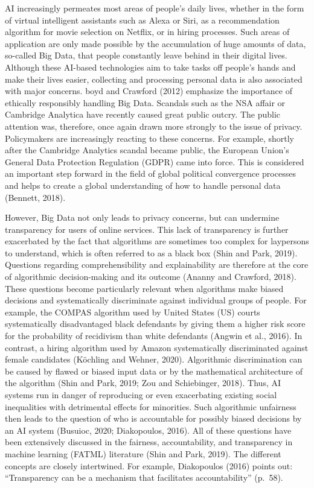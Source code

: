 \documentclass{article}
\begin{document}
AI increasingly permeates most areas of people's daily lives, whether in
the form of virtual intelligent assistants such as Alexa or Siri, as a
recommendation algorithm for movie selection on Netflix, or in hiring
processes. Such areas of application are only made possible by the
accumulation of huge amounts of data, so-called Big Data, that people
constantly leave behind in their digital lives. Although these AI-based
technologies aim to take tasks off people's hands and make their lives
easier, collecting and processing personal data is also associated with
major concerns. boyd and Crawford (2012) emphasize the importance of
ethically responsibly handling Big Data. Scandals such as the NSA affair
or Cambridge Analytica have recently caused great public outcry. The
public attention was, therefore, once again drawn more strongly to the
issue of privacy. Policymakers are increasingly reacting to these
concerns. For example, shortly after the Cambridge Analytics scandal
became public, the European Union's General Data Protection Regulation
(GDPR) came into force. This is considered an important step forward in
the field of global political convergence processes and helps to create
a global understanding of how to handle personal data (Bennett, 2018).

However, Big Data not only leads to privacy concerns, but can undermine
transparency for users of online services. This lack of transparency is
further exacerbated by the fact that algorithms are sometimes too
complex for laypersons to understand, which is often referred to as a
black box (Shin and Park, 2019). Questions regarding comprehensibility
and explainability are therefore at the core of algorithmic
decision-making and its outcome (Ananny and Crawford, 2018). These
questions become particularly relevant when algorithms make biased
decisions and systematically discriminate against individual groups of
people. For example, the COMPAS algorithm used by United States (US)
courts systematically disadvantaged black defendants by giving them a
higher risk score for the probability of recidivism than white
defendants (Angwin et al., 2016). In contrast, a hiring algorithm used
by Amazon systematically discriminated against female candidates
(Köchling and Wehner, 2020). Algorithmic discrimination can be caused by
flawed or biased input data or by the mathematical architecture of the
algorithm (Shin and Park, 2019; Zou and Schiebinger, 2018). Thus, AI
systems run in danger of reproducing or even exacerbating existing
social inequalities with detrimental effects for minorities. Such
algorithmic unfairness then leads to the question of who is accountable
for possibly biased decisions by an AI system (Busuioc, 2020;
Diakopoulos, 2016). All of these questions have been extensively
discussed in the fairness, accountability, and transparency in machine
learning (FATML) literature (Shin and Park, 2019). The different
concepts are closely intertwined. For example, Diakopoulos (2016) points
out: ``Transparency can be a mechanism that facilitates accountability''
(p.~58).
\end{document}
